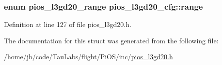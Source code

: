 \hypertarget{structpios__l3gd20__cfg_acc8d8efddd5b48a7febd54c5a4c5cb4b}{
\subsubsection[{range}]{\setlength{\rightskip}{0pt plus 5cm}enum {\bf pios\-\_\-l3gd20\-\_\-range} {\bf pios\-\_\-l3gd20\-\_\-cfg\-::range}}}\label{structpios__l3gd20__cfg_acc8d8efddd5b48a7febd54c5a4c5cb4b}


\-Definition at line 127 of file pios\-\_\-l3gd20.\-h.



\-The documentation for this struct was generated from the following file\-:\begin{DoxyCompactItemize}
\item 
/home/jb/code/\-Tau\-Labs/flight/\-Pi\-O\-S/inc/\hyperlink{pios__l3gd20_8h}{pios\-\_\-l3gd20.\-h}\end{DoxyCompactItemize}
